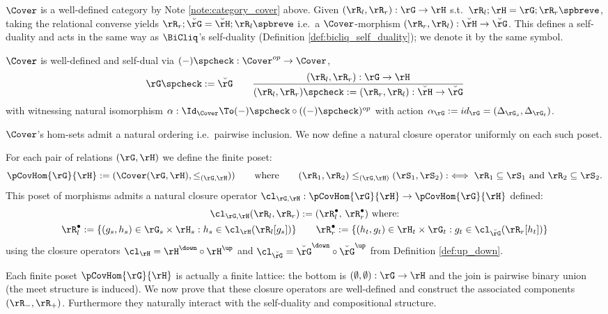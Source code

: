 \documentclass{article}
\begin{document}
$\Cover$ is a well-defined category by Note \ref{note:category_cover} above. Given $(\rR_l,\rR_r) : \rG \to \rH$ s.t.\ $\rR_l ; \rH = \rG ; \rR_r\spbreve$, taking the relational converse yields $\rR_r ; \breve{\rG} = \breve{\rH} ; \rR_l\spbreve$ i.e.\ a $\Cover$-morphism $(\rR_r,\rR_l) : \breve{\rH} \to \breve{\rG}$. This defines a self-duality and acts in the same way as $\BiCliq$'s self-duality (Definition \ref{def:bicliq_self_duality}); we denote it by the same symbol.

\begin{lemma}
$\Cover$ is well-defined and self-dual via
$(-)\spcheck : \Cover^{op} \to \Cover$,
\[
\rG\spcheck := \breve{\rG}
\qquad
\dfrac{(\rR_l,\rR_r) : \rG \to \rH}{(\rR_l,\rR_r)\spcheck := (\rR_r,\rR_l) : \breve{\rH} \to \breve{\rG}}
\]
with witnessing natural isomorphism $\alpha : \Id_{\Cover} \To (-)\spcheck \circ ((-)\spcheck)^{op}$ with action $\alpha_\rG := id_\rG = (\Delta_{\rG_s},\Delta_{\rG_t})$.
\end{lemma}

$\Cover$'s hom-sets admit a natural ordering i.e.\ pairwise inclusion. We now define a natural closure operator uniformly on each such poset.

\begin{definition}
For each pair of relations $(\rG,\rH)$ we define the finite poset:
\[
\pCovHom{\rG}{\rH} := (\Cover(\rG,\rH),\leq_{(\rG,\rH}))
\qquad
\text{where}
\qquad
(\rR_1,\rR_2) \leq_{(\rG,\rH)} (\rS_1,\rS_2) :\iff \rR_1 \subseteq \rS_1
\text{ and }
\rR_2 \subseteq \rS_2.
\]
This poset of morphisms admits a natural closure operator $\cl_{\rG,\rH} : \pCovHom{\rG}{\rH} \to \pCovHom{\rG}{\rH}$ defined:
\[
\begin{tabular}{c}
$\cl_{\rG,\rH}(\rR_l,\rR_r) := (\rR_l^\bullet,\,\rR_r^\bullet)$ where:
\\[1ex]
$\rR_l^\bullet := \{ (g_s,h_s) \in \rG_s \times \rH_s : h_s \in \cl_\rH(\rR_l[g_s]) \}
\qquad
\rR_r^\bullet := \{ (h_t,g_t) \in \rH_t \times \rG_t : g_t \in \cl_{\breve{\rG}}(\rR_r[h_t]) \}$
\end{tabular}
\]
using the closure operators $\cl_\rH = \rH^\down \circ \rH^\up$ and $\cl_{\breve{\rG}} = \breve{\rG}^\down \circ \breve{\rG}^\up$ from Definition \ref{def:up_down}. \endbox
\end{definition}

\smallskip
Each finite poset $\pCovHom{\rG}{\rH}$ is actually a finite lattice: the bottom is $(\emptyset,\emptyset) : \rG \to \rH$ and the join is pairwise binary union (the meet structure is induced). We now prove that these closure operators are well-defined and construct the associated components $(\rR_-,\rR_+)$. Furthermore they naturally interact with the self-duality and compositional structure.
\end{document}
